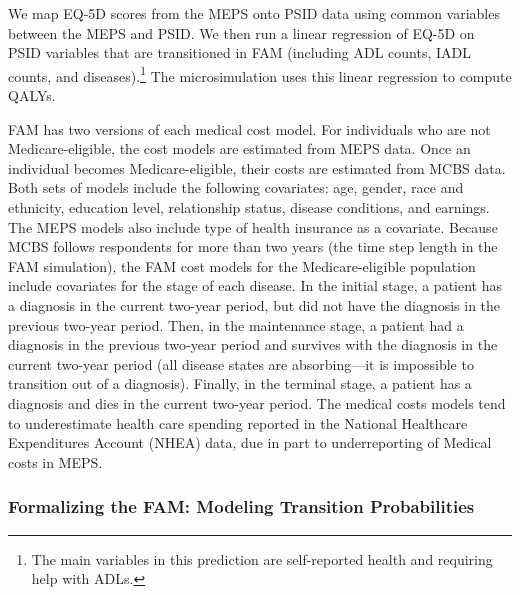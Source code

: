We map EQ-5D scores from the MEPS onto PSID data using common variables between the MEPS and PSID. We then run a linear regression of EQ-5D on PSID variables that are transitioned in FAM (including ADL counts, IADL counts, and diseases).\footnote{The main variables in this prediction are self-reported health and requiring help with ADLs.} The microsimulation uses this linear regression to compute QALYs.
%


\noindent FAM has two versions of each medical cost model. For individuals who are not Medicare-eligible, the cost models are estimated from MEPS data.
Once an individual becomes Medicare-eligible, their costs are estimated from MCBS data. Both sets of models include the following covariates:
age, gender, race and ethnicity, education level, relationship status, disease conditions, and earnings.
The MEPS models also include type of health insurance as a covariate.
Because MCBS follows respondents for more than two years (the time step length in the FAM simulation), the FAM cost models for the Medicare-eligible population include covariates for the stage of each disease.
In the initial stage, a patient has a diagnosis in the current two-year period, but did not have the diagnosis in the previous two-year period.
Then, in the maintenance stage, a patient had a diagnosis in the previous two-year period and survives with the diagnosis in the current two-year period (all disease states are absorbing---it is impossible to transition out of a diagnosis).
Finally, in the terminal stage, a patient has a diagnosis and dies in the current two-year period.
The medical costs models tend to underestimate health care spending reported in the National Healthcare Expenditures Account (NHEA) data, due in part to underreporting of Medical costs in MEPS.

\subsubsection{Formalizing the FAM: Modeling Transition Probabilities}
\label{section:transition_models}

